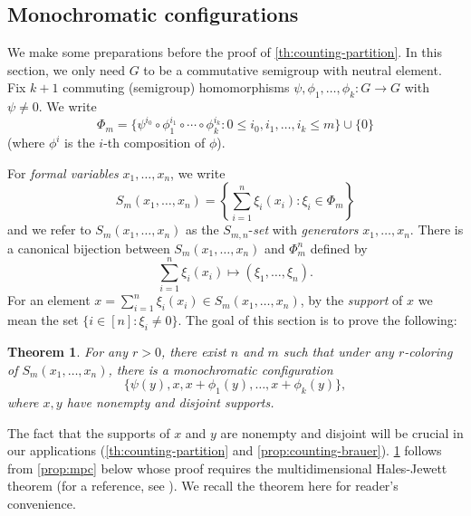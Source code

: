\documentclass[10pt]{article}
\newtheorem{theorem}{Theorem}[section]
\theoremstyle{definition}
\begin{document}
\subsection{Monochromatic configurations}
We make some preparations before the proof of \cref{th:counting-partition}. In this section, we only need $G$ to be a commutative semigroup with neutral element. Fix $k+1$ commuting (semigroup)  homomorphisms $\psi, \phi_1, \ldots, \phi_k: G \rightarrow G$ with $\psi \neq 0$. 
We write 
\[
\Phi_m = \{ \psi^{i_0} \circ \phi_1^{i_1} \circ \cdots \circ \phi_k^{i_k} : 0 \leq i_0, i_1, \ldots, i_k \leq m \} \cup \{ 0 \}
\] (where $\phi^i$ is the $i$-th composition of $\phi$).

For \textit{formal variables} $x_1, \ldots, x_n$, we write
\[
S_m(x_1,\ldots, x_n) = \left\{ \sum_{i=1}^n \xi_i (x_i) : \xi_i \in \Phi_m \right\} 
\]
and we refer to $S_m(x_1,\ldots, x_n)$ as the $S_{m,n}$-\textit{set} with \textit{generators} $x_1, \ldots, x_n$. There is a canonical bijection between $S_m(x_1, \ldots, x_n)$ and $\Phi_m^n$ defined by
\[
    \sum_{i=1}^n \xi_i(x_i) \mapsto (\xi_1, \ldots, \xi_n).
\]
 For an element $x = \sum_{i=1}^n \xi_i (x_i) \in S_m(x_1,\ldots, x_n)$, by the \textit{support} of $x$ we mean the set $\{ i \in [n]: \xi_i \neq 0\}$.
The goal of this section is to prove the following:

\begin{theorem} \label{th:mpc-hom} 
For any $r > 0$, there exist $n$ and $m$ such that under any $r$-coloring of $S_m(x_1,\ldots, x_n)$, there is a monochromatic configuration
\[
\{ \psi(y), x, x + \phi_1(y), \ldots, x+ \phi_k(y) \},
\]
where $x, y$ have nonempty and disjoint supports.
\end{theorem}
The fact that the supports of $x$ and $y$ are nonempty and disjoint will be crucial in our applications (\cref{th:counting-partition} and \cref{prop:counting-brauer}). \cref{th:mpc-hom} follows from \cref{prop:mpc} below whose proof requires the multidimensional Hales-Jewett theorem (for a reference, see \cite[Theorem 7, p.40]{ramsey-book}). We recall the theorem here for reader's convenience.

\end{document}
